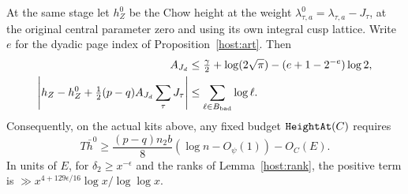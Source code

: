 \begin{corollary}
\label{recheight:untwisted}
At the same stage let \(h_Z^0\) be the Chow height at the weight
\(\lambda^0_{\tau,a}=\lambda_{\tau,a}-J_\tau\), at the original
central parameter zero and using its own integral cusp lattice.
Write \(e\) for the dyadic page index of
Proposition~\ref{host:art}. Then
\begin{align}
 A_{J_d}&\le \tfrac{\gamma}{2}+\log(2\sqrt\pi)
                   -(e+1-2^{-e})\log2 , \label{recheight:cmsign}\\
 \left|h_Z-h_Z^0+\tfrac12(p-q) A_{J_d}
                          \sum_\tau J_\tau\right|
              &\le\sum_{\ell\in B_{\rm bad}}\log\ell .
                 \label{recheight:flatboth}
\end{align}
Consequently, on the actual kits above, any fixed budget
\(\texttt{HeightAt}(C)\) requires
\[
        T\bar h^0\ge \frac{(p-q)n_2 b}{8}
                      (\log n-O_\psi(1))-O_C(E).
\]
In units of \(E\), for \(\delta_2\ge x^{-\epsilon}\) and the ranks of
Lemma~\ref{host:rank}, the positive term is
\(\gg x^{4+129\epsilon/16}\log x/\log\log x\).
\end{corollary}
